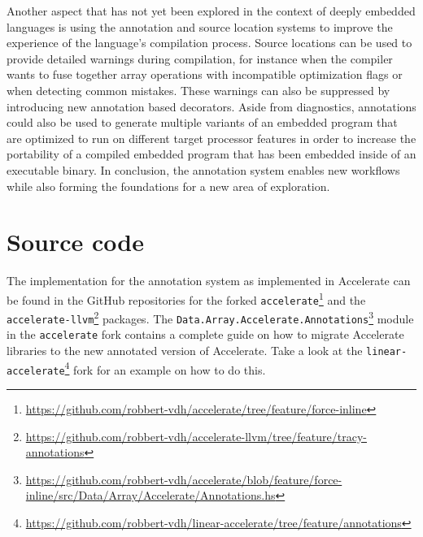 \documentclass[fontsize=11pt,a4paper,parskip=half,numbers=noenddot]{scrartcl}
\newcommand{\hask}[1]{\texttt{#1}}
\begin{document}
Another aspect that has not yet been explored in the context of deeply embedded
languages is using the annotation and source location systems to improve the
experience of the language's compilation process. Source locations can be used
to provide detailed warnings during compilation, for instance when the compiler
wants to fuse together array operations with incompatible optimization flags or
when detecting common mistakes. These warnings can also be suppressed by
introducing new annotation based decorators. Aside from diagnostics, annotations
could also be used to generate multiple variants of an embedded program that are
optimized to run on different target processor features in order to increase the
portability of a compiled embedded program that has been embedded inside of an
executable binary. In conclusion, the annotation system enables new workflows
while also forming the foundations for a new area of exploration.

\appendix
\section{Source code}\label{sec:source-code}

The implementation for the annotation system as implemented in Accelerate can be
found in the GitHub repositories for the forked
\texttt{accelerate}\footnote{\url{https://github.com/robbert-vdh/accelerate/tree/feature/force-inline}}
and the
\texttt{accelerate-llvm}\footnote{\url{https://github.com/robbert-vdh/accelerate-llvm/tree/feature/tracy-annotations}}
packages. The
\hask{Data.Array.Accelerate.Annotations}\footnote{\url{https://github.com/robbert-vdh/accelerate/blob/feature/force-inline/src/Data/Array/Accelerate/Annotations.hs}}
module in the \texttt{accelerate} fork contains a complete guide on how to
migrate Accelerate libraries to the new annotated version of Accelerate. Take a
look at the
\texttt{linear-accelerate}\footnote{\url{https://github.com/robbert-vdh/linear-accelerate/tree/feature/annotations}}
fork for an example on how to do this.

\printbibliography{}
\end{document}
